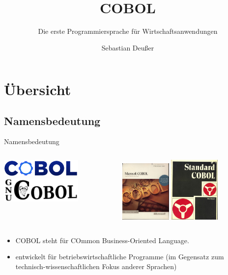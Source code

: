 \documentclass[handout]{beamer}
\title[COBOL-\"Uberblick]   %
{COBOL}
\subtitle
{Die erste Programmiersprache für Wirtschaftsanwendungen} %
\author %
{Sebastian Deußer}
\begin{document}
\begin{frame}
  \titlepage
\end{frame}


\section{Übersicht}
\subsection{Namensbedeutung}
\begin{frame}{Namensbedeutung}
	\begin{columns}[c]
		\begin{column}{4cm}
			\includegraphics[width=4cm]{CobolCogLogo}\\ 
			\includegraphics[width=4cm]{GnuCOBOLLogoTransparent}
		\end{column}
		\begin{column}{6cm}
			\includegraphics[width=2.5cm]{DOSMSCOBOL45} \hspace{1.5pt}
			\includegraphics[width=2.5cm]{StandardCobol}
		\end{column}
	\end{columns}
	\begin{itemize}[<+->]
		\item
			COBOL steht für COmmon Business-Oriented Language.
		\item
			entwickelt für betriebswirtschaftliche Programme (im Gegensatz zum technisch-wissenschaftlichen Fokus anderer Sprachen)
	\end{itemize}
\end{frame}
\end{document}
